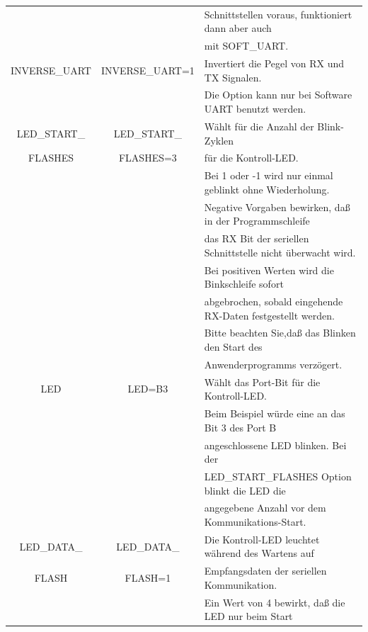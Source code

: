 \begin{table}[H]
\begin{center}
\begin{tabular}{| c | c | l |}
                   &                & Schnittstellen voraus, funktioniert dann aber auch \\
		   &                & mit SOFT\_UART. \\
    \hline
    INVERSE\_UART  & INVERSE\_UART=1 & Invertiert die Pegel von RX und TX Signalen. \\
	           &                & Die Option kann nur bei Software UART benutzt werden.\\
    \hline
 LED\_START\_      & LED\_START\_   & Wählt für die Anzahl der Blink-Zyklen \\
   FLASHES         &   FLASHES=3    & für die Kontroll-LED.                            \\
                   &                & Bei 1 oder -1 wird nur einmal geblinkt ohne Wiederholung. \\
                   &                & Negative Vorgaben bewirken, daß in der Programmschleife \\
                   &                & das RX Bit der seriellen Schnittstelle nicht überwacht wird. \\
                   &                & Bei positiven Werten wird die Binkschleife sofort \\
		   &                & abgebrochen, sobald eingehende RX-Daten festgestellt werden. \\
                   &                & Bitte beachten Sie,daß das Blinken den Start des \\
                   &                & Anwenderprogramms verzögert. \\
    \hline
 LED               & LED=B3         & Wählt das Port-Bit für die  Kontroll-LED. \\
                   &                & Beim Beispiel würde eine an das Bit 3 des Port B \\ 
                   &                & angeschlossene LED blinken. Bei der \\
                   &                & LED\_START\_FLASHES  Option  blinkt die LED die\\
                   &                & angegebene Anzahl vor dem Kommunikations-Start. \\
    \hline
 LED\_DATA\_       & LED\_DATA\_    & Die Kontroll-LED leuchtet während des Wartens auf \\
      FLASH        &    FLASH=1     & Empfangsdaten der seriellen Kommunikation.\\
	           &                & Ein Wert von 4 bewirkt, daß die LED nur beim Start \\

\end{tabular}
\end{center}
\end{table}
